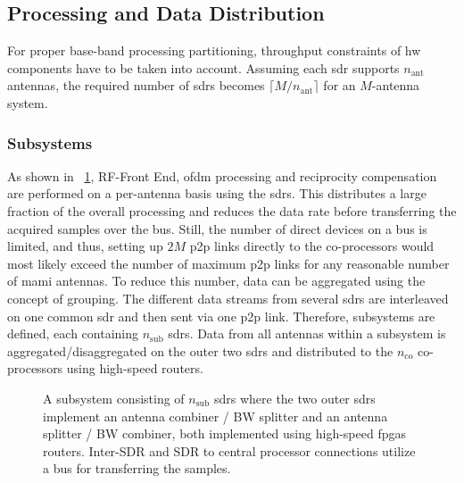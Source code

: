 \documentclass[journal]{IEEEtran}
\begin{document}
%
%
%
%
\subsection{Processing and Data Distribution}
For proper base-band processing partitioning, throughput constraints of \gls{hw} components have to be taken into account.
Assuming each \gls{sdr} supports $n_\text{ant}$ antennas, the required number of \glspl{sdr} becomes $\lceil M/n_\text{ant}\rceil$ for an $M$-antenna system.
%
%
%
%
%
%
%

\subsubsection{Subsystems}
As shown in \figurename~\ref{fig:subsystem}, RF-Front End, \gls{ofdm} processing and reciprocity compensation are performed on a per-antenna basis using the \glspl{sdr}.
This distributes a large fraction of the overall processing and reduces the data rate before transferring the acquired samples over the bus.
%
%
%
%
Still, the number of direct devices on a bus is limited, and thus, setting up $2M$ \gls{p2p} links directly to the co-processors would most likely exceed the number of maximum \gls{p2p} links for any reasonable number of \gls{mami} antennas.
To reduce this number, data can be aggregated using the concept of grouping. 
The different data streams from several \glspl{sdr} are interleaved on one common \gls{sdr} and then sent via one \gls{p2p} link.
Therefore, subsystems are defined, each containing $n_\text{sub}$ \glspl{sdr}.
Data from all antennas within a subsystem is aggregated/disaggregated on the outer two \glspl{sdr} and distributed to the $n_\text{co}$ co-processors using high-speed routers.
%
%
%
%
%
%
%
%
%
\begin{figure}
	\centering
	\hspace*{0pt}
	\caption{A subsystem consisting of $n_\text{sub}$ \glspl{sdr} where the two outer \glspl{sdr} implement an antenna combiner / BW splitter and an antenna splitter / BW combiner, both implemented using high-speed \glspl{fpga} routers. Inter-SDR and SDR to central processor connections utilize a bus for transferring the samples.}
	\label{fig:subsystem}
\end{figure}
\end{document}
